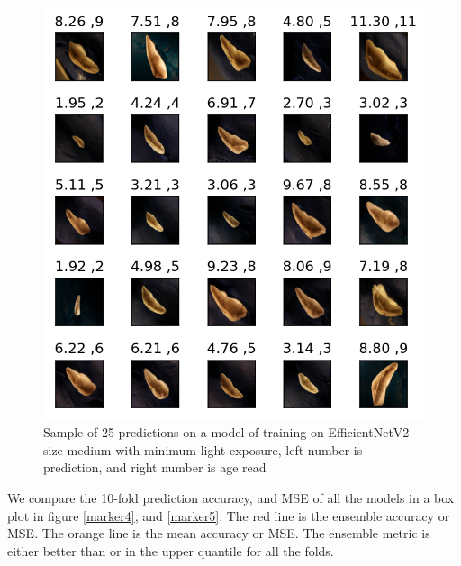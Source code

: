 \documentclass[10pt,letterpaper]{article}
\begin{document}
\begin{figure}[h!]
  \centering
  \begin{minipage}[b]{1.0\textwidth}
  \includegraphics[scale=0.75]{results/fold_prediction_V2_m.png}
    \caption{Sample of 25 predictions on a model of training on EfficientNetV2 size medium with minimum light exposure, left number is prediction,
    and right number is age read}
   \label{marker3}
  \end{minipage}
  \hfill
\end{figure}

We compare the 10-fold prediction accuracy, and MSE of all the models in a box plot in
figure \ref{marker4}, and \ref{marker5}. The red line 
is the ensemble accuracy or MSE. The orange line is the mean accuracy or MSE. 
The ensemble metric is either better than or in the upper quantile for all the folds.
\end{document}
